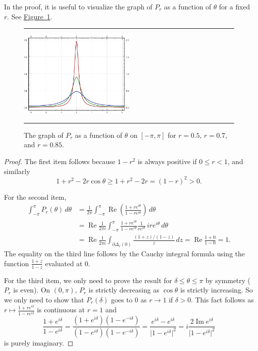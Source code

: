 \documentclass[12pt,openany]{book}
\renewcommand{\Re}{\operatorname{Re}}
\renewcommand{\Im}{\operatorname{Im}}
\newcommand{\sabs}[1]{\lvert {#1} \rvert}
\theoremstyle{plain}
\theoremstyle{remark}
\theoremstyle{definition}
\newenvironment{myfig}{%
\begin{figure}[h!t]
\noindent\rule{\textwidth}{0.5pt}\vspace{12pt}\par\centering}%
{\par\noindent\rule{\textwidth}{0.5pt}
\end{figure}}
\theoremstyle{exercise}
\theoremstyle{example}
\newcommand{\figureref}[1]{\hyperref[#1]{Figure~\ref*{#1}}}
\begin{document}
In the proof, it is useful to visualize the graph of
$P_r$ as a function of $\theta$ for a fixed $r$.
See \figureref{fig:poisson2dgraph}.

\begin{myfig}
\includegraphics[width=0.5\textwidth]{figures/poisson-kernel.pdf}
\caption{The graph of $P_r$ as a function of $\theta$ on $[-\pi,\pi]$ for
$r=0.5$, $r=0.7$, and $r=0.85$.\label{fig:poisson2dgraph}}
\end{myfig}

\begin{proof}
The first item follows because $1-r^2$ is always positive if $0 \leq r < 1$,
and similarly
\begin{equation*}
1+r^2-2r \cos\theta \geq 1+r^2-2r = {(1-r)}^2 > 0 .
\end{equation*}

For the second item,
\begin{equation*}
\begin{split}
\int_{-\pi}^{\pi}
P_r(\theta) \, d\theta
& =
\frac{1}{2\pi}
\int_{-\pi}^{\pi}
\Re
\left(
\frac{1+re^{i\theta}}{1-re^{i\theta}}
\right)
\, d\theta
\\
& =
\Re
\frac{1}{2\pi i}
\int_{-\pi}^{\pi}
\frac{1+re^{i\theta}}{1-re^{i\theta}} \frac{1}{re^{i\theta}} \,
ire^{i\theta}
\, d\theta
\\
& = 
\Re
\frac{1}{2\pi i}
\int_{\partial \Delta_r(0)}
\frac{(1+z)/(1-z)}{z} \, dz
=
\Re \frac{1+0}{1-0} = 1 .
\end{split}
\end{equation*}
The equality on the third line follows by the Cauchy integral formula
using the function $\frac{1+z}{1-z}$ evaluated at $0$.

For the third item, we only need to prove the
result for $\delta \leq \theta \leq \pi$ by symmetry ($P_r$ is even).
On $(0,\pi)$, $P_r$ is strictly decreasing as $\cos \theta$ is strictly
increasing.  So we only need to show that $P_r(\delta)$ goes to $0$
as $r \to 1$ if $\delta > 0$.
This fact follows as $r \mapsto
\frac{1+re^{i\delta}}{1-re^{i\delta}}$
is continuous at $r=1$ and
\begin{equation*}
\frac{1+e^{i\delta}}{1-e^{i\delta}}
=
\frac{(1+e^{i\delta})(1-e^{-i\delta})}{(1-e^{i\delta})(1-e^{-i\delta})}
=
\frac{e^{i\delta}-e^{i\delta}}{\sabs{1-e^{i\delta}}^2}
=
i \frac{2\Im e^{i\delta}}{\sabs{1-e^{i\delta}}^2}
\end{equation*}
is purely imaginary.
\end{proof}
\end{document}
